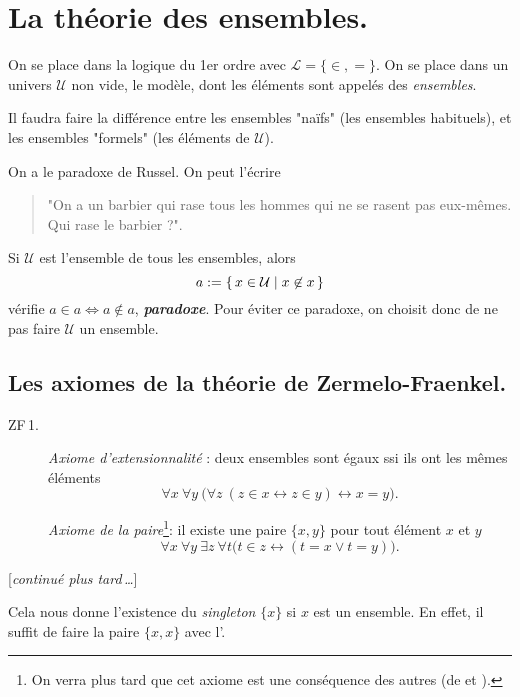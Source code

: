 \documentclass[./main]{subfiles}
\begin{document}
  \chapter{La théorie des ensembles.}

  On se place dans la logique du 1er ordre avec $\mathcal{L} = \{{\in}, {=}\}$.
  On se place dans un univers $\mathcal{U}$ non vide, le modèle, dont les éléments sont appelés des \textit{ensembles}.

  Il faudra faire la différence entre les ensembles "naïfs" (les ensembles habituels), et les ensembles "formels" (les éléments de $\mathcal{U}$).

  On a le paradoxe de Russel. On peut l'écrire 
  \begin{quote}
    "On a un barbier qui rase tous les hommes qui ne se rasent pas eux-mêmes. Qui rase le barbier ?".
  \end{quote}
  Si $\mathcal{U}$ est l'ensemble de tous les ensembles, alors \[
  a := \mleft\{\,x \in \mathcal{U} \;\middle|\; x \not\in x\,\mright\}
  \]
  vérifie $a \in a \iff a \not\in a$, \textit{\textbf{paradoxe}}.
  Pour éviter ce paradoxe, on choisit donc de ne pas faire $\mathcal{U}$ un ensemble.

  \section{Les axiomes de la théorie de Zermelo-Fraenkel.}

  \begin{description}
    \item[ZF\,1.] \label{ZF1}\textit{Axiome d'extensionnalité} : deux ensembles sont égaux ssi ils ont les mêmes éléments \[
      \forall x \: \forall y \: \big(\forall z \: (z \in x \leftrightarrow z \in y) \leftrightarrow x = y\big)
      .\]
    \item[\bullet] \label{pair-axiom} \textit{Axiome de la paire}\footnote{On verra plus tard que cet axiome est une conséquence des autres (de  et ).}\showfootnote :
      il existe une paire $\{x,y\}$ pour tout élément $x$ et $y$
      \[
      \forall x \: \forall y \: \exists  z\: \forall t \big(t \in z \leftrightarrow (t = x \lor t = y)\big)
      .\]
  \end{description}

  [\textit{continué plus tard\,\ldots}]

  \begin{rmk}
    Cela nous donne l'existence du \textit{singleton} $\{x\}$ si $x$ est un ensemble. En effet, il suffit de faire la paire $\{x,x\}$ avec l'\pairaxiom.
  \end{rmk}
\end{document}
